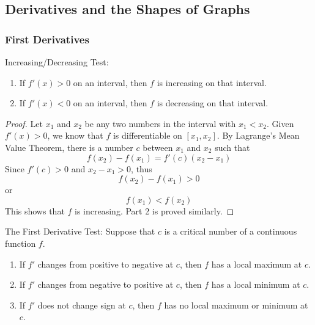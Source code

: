 \subsection{Derivatives and the Shapes of Graphs}

\subsubsection*{First Derivatives}
Increasing/Decreasing Test:
\begin{enumerate}
    \item If \(f'(x)>0\) on an interval, then \(f\) is increasing on that
    interval.
    \item If \(f'(x)<0\) on an interval, then \(f\) is decreasing on that
    interval.
\end{enumerate}
\begin{proof}
    Let \(x_1\) and \(x_2\) be any two numbers in the interval with
    \(x_1<x_2\).
    Given \(f'(x)>0\), we know that \(f\) is differentiable on \([x_1,x_2]\).
    By Lagrange's Mean Value Theorem, there is a number \(c\) between \(x_1\)
    and \(x_2\) such that
    \[f(x_2)-f(x_1)=f'(c)(x_2-x_1)\]
    Since \(f'(c)>0\) and \(x_2-x_1>0\), thus
    \[f(x_2)-f(x_1)>0\]
    or
    \[f(x_1)<f(x_2)\]
    This shows that \(f\) is increasing.
    Part 2 is proved similarly.
\end{proof}
The First Derivative Test: Suppose that \(c\) is a critical number of a
continuous function \(f\).
\begin{enumerate}
    \item If \(f'\) changes from positive to negative at \(c\), then \(f\) has
    a local maximum at \(c\).
    \item If \(f'\) changes from negative to positive at \(c\), then \(f\) has
    a local minimum at \(c\).
    \item If \(f'\) does not change sign at \(c\), then \(f\) has no local
    maximum or minimum at \(c\).
\end{enumerate}

